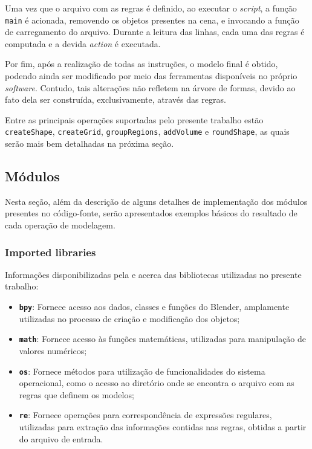 Uma vez que o arquivo com as regras é definido, ao executar o \textit{script}, a função \texttt{main} é acionada, removendo os objetos presentes na cena, e invocando a função de carregamento do arquivo. Durante a leitura das linhas, cada uma das regras é computada e a devida \textit{action} é executada.

Por fim, após a realização de todas as instruções, o modelo final é obtido, podendo ainda ser modificado por meio das ferramentas disponíveis no próprio \textit{software}. Contudo, tais alterações não refletem na árvore de formas, devido ao fato dela ser construída, exclusivamente, através das regras.

Entre as principais operações suportadas pelo presente trabalho estão \texttt{createShape}, \texttt{createGrid}, \texttt{groupRegions}, \texttt{addVolume} e \texttt{roundShape}, as quais serão mais bem detalhadas na próxima seção.

\subsection{Módulos}
\label{sec:modulos}

Nesta seção, além da descrição de alguns detalhes de implementação dos módulos presentes no código-fonte, serão apresentados exemplos básicos do resultado de cada operação de modelagem.

\subsubsection{Imported libraries}
\label{sec:imports}

Informações disponibilizadas pela  e  acerca das bibliotecas utilizadas no presente trabalho:

\begin{itemize}
    \item \textbf{\texttt{bpy}}: Fornece acesso aos dados, classes e funções do Blender, amplamente utilizadas no processo de criação e modificação dos objetos;
    
    \item \textbf{\texttt{math}}: Fornece acesso às funções matemáticas, utilizadas para manipulação de valores numéricos;
    
    \item \textbf{\texttt{os}}: Fornece métodos para utilização de funcionalidades do sistema operacional, como o acesso ao diretório onde se encontra o arquivo com as regras que definem os modelos;
    
    \item \textbf{\texttt{re}}: Fornece operações para correspondência de expressões regulares, utilizadas para extração das informações contidas nas regras, obtidas a partir do arquivo de entrada.
\end{itemize}

